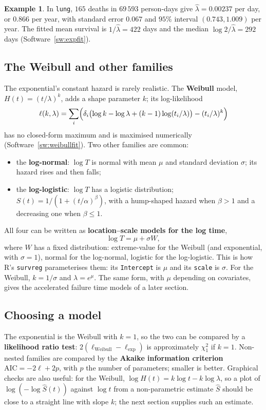 \documentclass[11pt,a4paper]{article}
\numberwithin{equation}{section}
\theoremstyle{definition}
\newtheorem{exa}[thm]{Example}
\begin{document}
\begin{exa}
\label{ex:lungexp}
In \texttt{lung}, $165$ deaths in $69\,593$ person-days give $\hat\lambda = 0.00237$ per day, or $0.866$ per year, with standard error $0.067$ and $95\%$ interval $(0.743, 1.009)$ per year. The fitted mean survival is $1/\hat\lambda = 422$ days and the median $\log 2/\hat\lambda = 292$ days (Software~\ref{sw:expfit}).
\end{exa}

\subsection{The Weibull and other families}
\label{ssec:families}

The exponential's constant hazard is rarely realistic. The \textbf{Weibull} model, $H(t) = (t/\lambda)^k$, adds a shape parameter $k$; its log-likelihood
\[
\ell(k, \lambda) = \sum_i\Bigl(\delta_i\bigl(\log k - \log\lambda + (k - 1)\log(t_i/\lambda)\bigr) - (t_i/\lambda)^k\Bigr)
\]
has no closed-form maximum and is maximised numerically (Software~\ref{sw:weibullfit}). Two other families are common:
\begin{itemize}
\item the \textbf{log-normal}: $\log T$ is normal with mean $\mu$ and standard deviation $\sigma$; its hazard rises and then falls;
\item the \textbf{log-logistic}: $\log T$ has a logistic distribution; $S(t) = 1/(1 + (t/\alpha)^\beta)$, with a hump-shaped hazard when $\beta > 1$ and a decreasing one when $\beta \leq 1$.
\end{itemize}
All four can be written as \textbf{location--scale models for the log time},
\[
\log T = \mu + \sigma W ,
\]
where $W$ has a fixed distribution: extreme-value for the Weibull (and exponential, with $\sigma = 1$), normal for the log-normal, logistic for the log-logistic. This is how R's \texttt{survreg} parameterises them: its \texttt{Intercept} is $\mu$ and its \texttt{scale} is $\sigma$. For the Weibull, $k = 1/\sigma$ and $\lambda = e^\mu$.
The same form, with $\mu$ depending on covariates, gives the accelerated failure time models of a later section.

\subsection{Choosing a model}
\label{ssec:choosing}

The exponential is the Weibull with $k = 1$, so the two can be compared by a \textbf{likelihood ratio test}: $2(\ell_{\text{Weibull}} - \ell_{\text{exp}})$ is approximately $\chi^2_1$ if $k = 1$. Non-nested families are compared by the \textbf{Akaike information criterion} $\text{AIC} = -2\ell + 2p$, with $p$ the number of parameters; smaller is better. Graphical checks are
also useful: for the Weibull, $\log H(t) = k\log t - k\log\lambda$, so a plot of $\log(-\log\hat S(t))$ against $\log t$ from a non-parametric estimate $\hat S$ should be close to a straight line with slope $k$; the next section supplies such an estimate.
\end{document}
